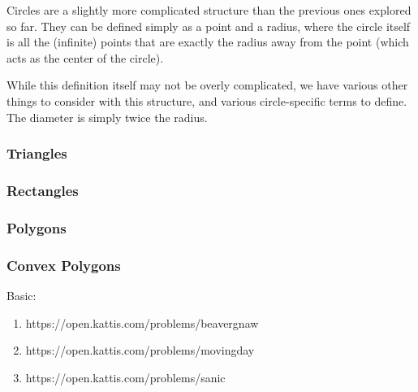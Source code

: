 Circles are a slightly more complicated structure than the previous ones explored so far. They can be defined simply as a point and a radius, where the circle itself is all the (infinite) points that are exactly the radius away from the point (which acts as the center of the circle).

While this definition itself may not be overly complicated, we have various other things to consider with this structure, and various circle-specific terms to define. The diameter is simply twice the radius.


\subsubsection{Triangles}

\subsubsection{Rectangles}

\subsubsection{Polygons}

\subsubsection{Convex Polygons}

\hrulefill

Basic:
\begin{enumerate}
\item https://open.kattis.com/problems/beavergnaw
\item https://open.kattis.com/problems/movingday
\item https://open.kattis.com/problems/sanic
\end{enumerate}
